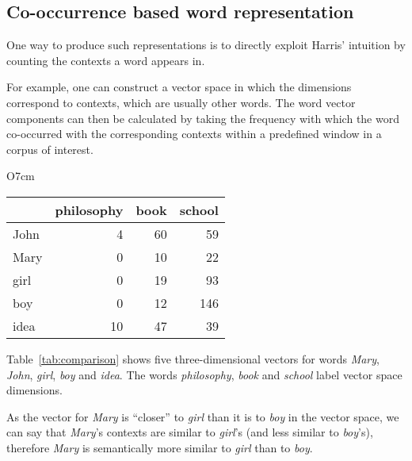 \subsection{Co-occurrence based word representation}
\label{sec:distr-repr}

One way to produce such representations is to directly exploit Harris' \citeyearpar{harris1954distributional} intuition by counting the contexts a word appears in.


For example, one can construct a vector space in which the dimensions correspond to contexts, which are usually other words. The word vector components can then be calculated by taking the frequency with which the word co-occurred with the corresponding contexts within a predefined window in a corpus of interest.

\begin{wraptable}[10]{O}{7cm}
  \centering
  \begin{tabular}{lrrr}
    \toprule
    & philosophy & book & school \\
    \midrule
    John & 4  & 60 & 59  \\
    Mary & 0  & 10 & 22  \\
    girl & 0  & 19 & 93  \\
    boy  & 0  & 12 & 146 \\
    idea & 10 & 47 & 39  \\
    \bottomrule
  \end{tabular}
  \caption{Word co-occurrence frequencies extracted from the BNC}
  \label{tab:comparison}
\end{wraptable}

Table~\ref{tab:comparison} shows five three-dimensional vectors for words \textit{Mary}, \textit{John}, \textit{girl}, \textit{boy} and \textit{idea}. The words \textit{philosophy}, \textit{book} and \textit{school} label vector space dimensions.

As the vector for \textit{Mary} is ``closer'' to \textit{girl} than it is to \textit{boy} in the vector space, we can say that \textit{Mary}'s contexts are similar to \textit{girl}'s (and less similar to \textit{boy}'s), therefore \textit{Mary} is semantically more similar to \textit{girl} than to \textit{boy}.

